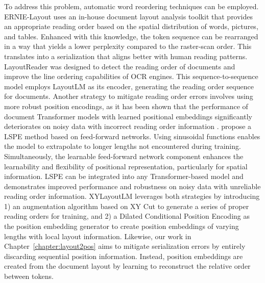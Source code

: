 To address this problem, automatic word reordering techniques can be employed. ERNIE-Layout \citep{peng2022ernie} uses an in-house document layout analysis toolkit that provides an appropriate reading order based on the spatial distribution of words, pictures, and tables. Enhanced with this knowledge, the token sequence can be rearranged in a way that yields a lower perplexity compared to the raster-scan order. This translates into a serialization that aligns better with human reading patterns. LayoutReader \citep{wang2021layoutreader} was designed to detect the reading order of documents and improve the line ordering capabilities of \ac{OCR} engines. This sequence-to-sequence model employs LayoutLM \citep{xu2020layoutlm} as its encoder, generating the reading order sequence for documents. Another strategy to mitigate reading order errors involves using more robust position encodings, as it has been shown that the performance of document Transformer models with learned positional embeddings significantly deteriorates on noisy data with incorrect reading order information \citep{hong2020bros}. \citet{wang2022simple} propose a \ac{LSPE} method based on feed-forward networks. Using sinusoidal functions enables the model to extrapolate to longer lengths not encountered during training. Simultaneously, the learnable feed-forward network component enhances the learnability and flexibility of positional representation, particularly for spatial information. \ac{LSPE} can be integrated into any Transformer-based model and demonstrates improved performance and robustness on noisy data with unreliable reading order information. XYLayoutLM \citep{gu2022xylayoutlm} leverages both strategies by introducing 1) an augmentation algorithm based on XY Cut \citep{ha1995recursive} to generate a series of proper reading orders for training, and 2) a Dilated Conditional Position Encoding as the position embedding generator to create position embeddings of varying lengths with local layout information. Likewise, our work in Chapter~\ref{chapter:layout2pos} aims to mitigate serialization errors by entirely discarding sequential position information. Instead, position embeddings are created from the document layout by learning to reconstruct the relative order between tokens.


